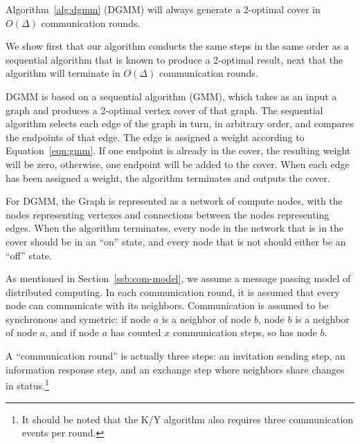 \begin{thm}
  Algorithm~\ref{alg:dgmm} (DGMM) will always generate a 2-optimal cover in $O(\Delta)$ communication rounds.
\label{thm:dgmm-term}
\end{thm}
\begin{smy}
We show first that our algorithm conducts the same steps in the same order as a sequential algorithm that is known to produce a 2-optimal result, next that the algorithm will terminate in $O(\Delta)$ communication rounds.
\end{smy} 
\begin{note}
\label{not:gmm-dgmm}
DGMM is based on a sequential algorithm (GMM), which takes as an input a graph and produces a 2-optimal vertex cover of that graph. The sequential algorithm selects each edge of the graph in turn, in arbitrary order, and compares the endpoints of that edge. The edge is assigned a weight according to Equation~\ref{eqn:gmm}. If one endpoint is already in the cover, the resulting weight will be zero, otherwise, one endpoint will be added to the cover. When each edge has been assigned a weight, the algorithm terminates and outputs the cover.

For DGMM, the Graph is represented as a network of compute nodes, with the nodes representing vertexes and connections between the nodes representing edges. When the algorithm terminates, every node in the network that is in the cover should be in an ``on'' state, and every node that is not should either be an ``off'' state.
\end{note}
\begin{note}
\label{not:com-model}
As mentioned in Section~\ref{ssb:com-model}, we assume a message passing model of distributed computing. In each communication round, it is assumed that every node can communicate with its neighbors. Communication is assumed to be synchronous and symetric: if node $a$ is a neighbor of node $b$, node $b$ is a neighbor of node $a$, and if node $a$ has counted $x$ communication steps, so has node $b$.

A ``communication round'' is actually three steps: an invitation sending step, an information response step, and an exchange step where neighbors share changes in status.\footnote{It should be noted that the K/Y algorithm also requires three communication events per round.} 
\end{note}

